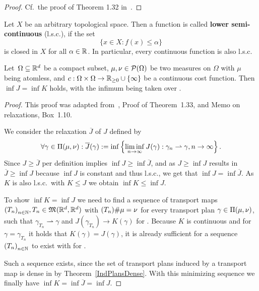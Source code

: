 \begin{proof}
	Cf.~the proof of Theorem 1.32 in~\cite{San2015}.
\end{proof}

\begin{definition}\label{lsc}
	Let $X$ be an arbitrary topological space. Then a function  is called \textbf{lower semi-continuous} (l.s.c.), if the set
	\[ \big\{ x \in X : f(x) \le \alpha \big\} \]
	is closed in $X$ for all $\alpha \in \R$. In particular, every continuous function  is also l.s.c.
\end{definition}

\begin{theorem}\label{InfCoincide}
	Let $\,\Omega \subseteq \R^d$ be a compact subset, $\mu, \nu \in \PM{\Omega}$ be two measures on $\Omega$ with $\mu$ being atomless, and $\map[c]{\Omega \times \Omega}{\RZero \cup \{ \infty \}}$ be a continuous cost function. Then $\inf J = \inf K$ holds, with the infimum being taken over \TP{\mu}{\nu}.
\end{theorem}

\begin{proof}
	This proof was adapted from~\cite{San2015}, Proof of Theorem~1.33, and Memo on relaxations, Box~1.10.

	We consider the relaxation $\overline{J}$ of $J$ defined by
	\[ \forall \gamma \in \TP{\mu}{\nu}: \overline{J}(\gamma) := \inf \left\{ \liminf\limits_{\Ninf} J(\gamma) : \weak{\gamma_n}{\gamma}, \Ninf \right\}. \]
	Since $J \ge \overline{J}$ per definition implies $\inf J \ge \inf \overline{J}$, and as $J \ge \inf J$ results in $\overline{J} \ge \inf J$ because $\inf J$ is constant and thus l.s.c., we get that $\inf J = \inf \overline{J}$. As $K$ is also l.s.c.\ with $K \le J$ we obtain $\inf K \le \inf J$.

	To show $\inf K = \inf J$ we need to find a sequence of transport maps ${(T_n)}_{\NinN}, T_n \in \MF{\R^d}{\R^d}$ with $\push[(T_n)]{\mu} = \nu$ for every transport plan $\gamma \in \TP{\mu}{\nu}$, such that $\gamma_{T_n} \rightharpoonup \gamma$ and $J(\gamma_{T_n}) \rightarrow K(\gamma)$ for \Ninf. Because $K$ is continuous and for $\gamma = \gamma_{T_n}$ it holds that $K(\gamma) = J(\gamma)$, it is already sufficient for a sequence ${(T_n)}_{\NinN}$ to exist with  for \Ninf.

	Such a sequence exists, since the set of transport plans induced by a transport map is dense in \TP{\mu}{\nu} by Theorem~\ref{IndPlansDense}. With this minimizing sequence we finally have $\inf K = \inf \overline{J} = \inf J$.
\end{proof}

